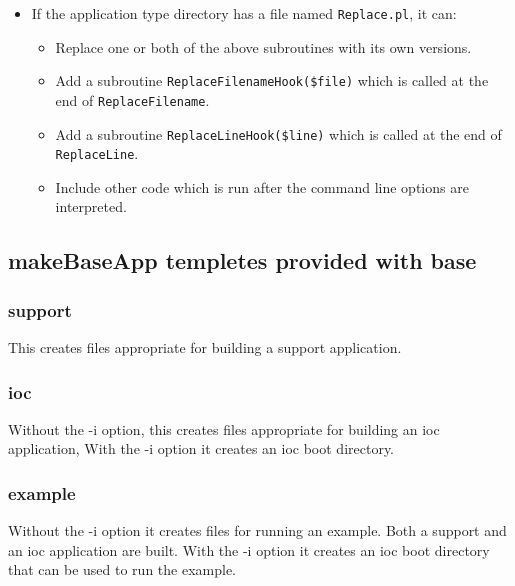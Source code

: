 \begin{itemize}
\item If the application type directory has a file named \verb|Replace.pl|, it can:

\begin{itemize}

\item Replace one or both of the above subroutines with its own versions.

\item Add a subroutine \verb|ReplaceFilenameHook($file)| which is called at the end of \verb|ReplaceFilename|. 

\item Add a subroutine \verb|ReplaceLineHook($line)| which is called at the end of \verb|ReplaceLine|.

\item Include other code which is run after the command line options are interpreted.

\end{itemize}

\end{itemize}


\subsection{makeBaseApp templetes provided with base}

\subsubsection{support}

This creates files appropriate for building a support application.

\subsubsection{ioc}

 Without the -i option, this creates files appropriate for building an ioc application, With the -i option it creates an ioc boot 
directory.

\subsubsection{example}

Without the -i option it creates files for running an example. Both a support and an ioc application are built. With the -i 
option it creates an ioc boot directory that can be used to run the example.

